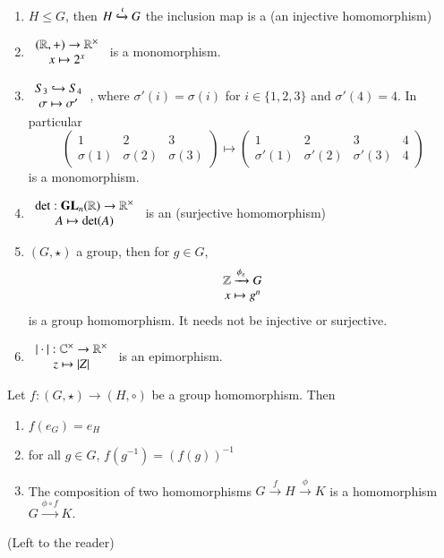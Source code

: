\documentclass[12pt, a4paper, twoside, openright, titlepage]{book}
\begin{document}
\begin{eg}{}{}
    \leavevmode
    \begin{enumerate}
        \item $H \leq G$, then $H \xhookrightarrow{\iota} G$ the inclusion map is a  (an injective homomorphism)
        \item $\begin{array}{c} (\mathbb R,+)\rightarrow \mathbb R^{\times} \\ x\mapsto 2^x \end{array}$ is a monomorphism.
        \item $\begin{array}{c} S_3 \hookrightarrow S_4 \\ \sigma \mapsto \sigma' \end{array}$, where $\sigma'(i) = \sigma(i)$ for $i \in \{1,2,3\}$ and $\sigma'(4) = 4$. In particular $$\begin{pmatrix} 1 & 2 & 3 \\ \sigma(1) & \sigma(2) & \sigma(3)  \end{pmatrix}\mapsto \begin{pmatrix} 1 & 2 & 3 & 4 \\ \sigma'(1) & \sigma'(2) & \sigma'(3) & 4  \end{pmatrix}$$
        is a monomorphism.
        \item $\begin{array}{c} \det:\mathbf{GL}_n(\mathbb R) \rightarrow \mathbb R^{\times} \\ A \mapsto \det(A) \end{array}$ is an  (surjective homomorphism)
        \item $(G,\star)$ a group, then for $g \in G$, $$\begin{array}{c} \mathbb Z\xrightarrow{\phi_g}G \\ x\mapsto g^n \end{array}$$ is a group homomorphism. It needs not be injective or surjective.
        \item $\begin{array}{c} |\cdot|:\mathbb C^{\times}\rightarrow \mathbb R^{\times} \\ z\mapsto |Z| \end{array}$ is an epimorphism.
    \end{enumerate}
\end{eg}


\begin{props}{}{}
    Let $f:(G,\star)\rightarrow (H,\circ)$ be a group homomorphism. Then \begin{enumerate}
        \item $f(e_G) = e_H$
        \item for all $g \in G$, $f(g^{-1}) = (f(g))^{-1}$
        \item The composition of two homomorphisms $G \xrightarrow{f} H \xrightarrow{\phi}K$ is a homomorphism $G\xrightarrow{\phi \circ f}K$.
    \end{enumerate}
\end{props}
\begin{proof*}{}{}
    (Left to the reader)
\end{proof*}
\end{document}

